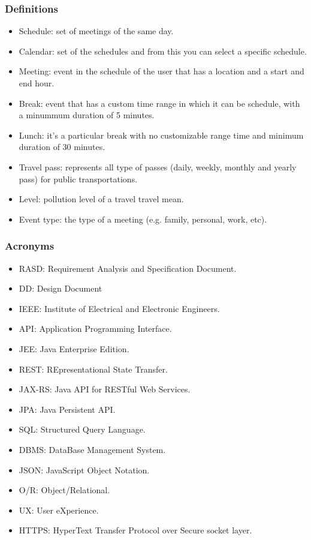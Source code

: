 \subsubsection{Definitions}
\begin{itemize}
\renewcommand\labelitemi{-}
\item
Schedule: set of meetings of the same day.
\item
Calendar: set of the schedules and from this you can select a specific schedule.
\item
Meeting: event in the schedule of the user that has a location and a start and end hour.
\item
Break: event that has a custom time range in which it can be schedule, with a minummum duration of 5 minutes.
\item
Lunch: it's a particular break with no customizable range time and minimum duration of 30 minutes.
\item
Travel pass: represents all type of passes (daily, weekly, monthly and yearly pass) for public transportations.
\item
Level: pollution level of a travel travel mean. 
\item
Event type: the type of a meeting (e.g. family, personal, work, etc). 
\end{itemize}


\subsubsection{Acronyms}
\begin{itemize}
\renewcommand\labelitemi{-}
\item
RASD: Requirement Analysis and Specification Document.
\item
DD: Design Document
\item
IEEE: Institute of Electrical and Electronic Engineers.
\item
API: Application Programming Interface.
\item
JEE: Java Enterprise Edition.
\item
REST: REpresentational State Transfer.
\item
JAX-RS: Java API for RESTful Web Services.
\item
JPA: Java Persistent API.
\item
SQL: Structured Query Language.
\item
DBMS: DataBase Management System.
\item
JSON: JavaScript Object Notation.
\item
O/R: Object/Relational.
\item
UX: User eXperience.
\item
HTTPS: HyperText Transfer Protocol over Secure socket layer.
\end{itemize}


